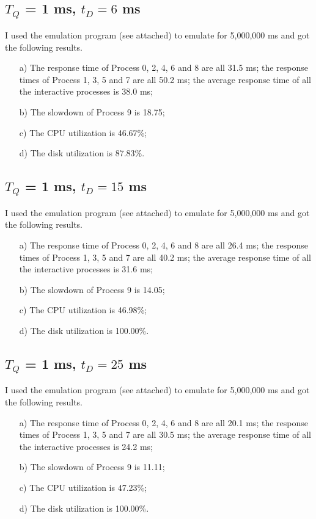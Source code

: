 \documentclass[12pt,letterpaper]{article}
\begin{document}
\subsection{$T_Q$ = 1 ms, $t_D=6$ ms}
I used the emulation program (see attached) to emulate for 5,000,000 ms and got the following results.
\begin{enumerate}
\item[a)] The response time of Process 0, 2, 4, 6 and 8 are all 31.5 ms; the response times of Process 1, 3, 5 and 7 are all 50.2 ms; the average response time of all the interactive processes is 38.0 ms;
\item[b)] The slowdown of Process 9 is 18.75;
\item[c)] The CPU utilization is 46.67\%;
\item[d)] The disk utilization is 87.83\%.
\end{enumerate}

\subsection{$T_Q$ = 1 ms, $t_D=15$ ms}
I used the emulation program (see attached) to emulate for 5,000,000 ms and got the following results.
\begin{enumerate}
\item[a)] The response time of Process 0, 2, 4, 6 and 8 are all 26.4 ms; the response times of Process 1, 3, 5 and 7 are all 40.2 ms; the average response time of all the interactive processes is 31.6 ms;
\item[b)] The slowdown of Process 9 is 14.05;
\item[c)] The CPU utilization is 46.98\%;
\item[d)] The disk utilization is 100.00\%.
\end{enumerate}

\subsection{$T_Q$ = 1 ms, $t_D=25$ ms}
I used the emulation program (see attached) to emulate for 5,000,000 ms and got the following results.
\begin{enumerate}
\item[a)] The response time of Process 0, 2, 4, 6 and 8 are all 20.1 ms; the response times of Process 1, 3, 5 and 7 are all 30.5 ms; the average response time of all the interactive processes is 24.2 ms;
\item[b)] The slowdown of Process 9 is 11.11;
\item[c)] The CPU utilization is 47.23\%;
\item[d)] The disk utilization is 100.00\%.
\end{enumerate}
\end{document}
